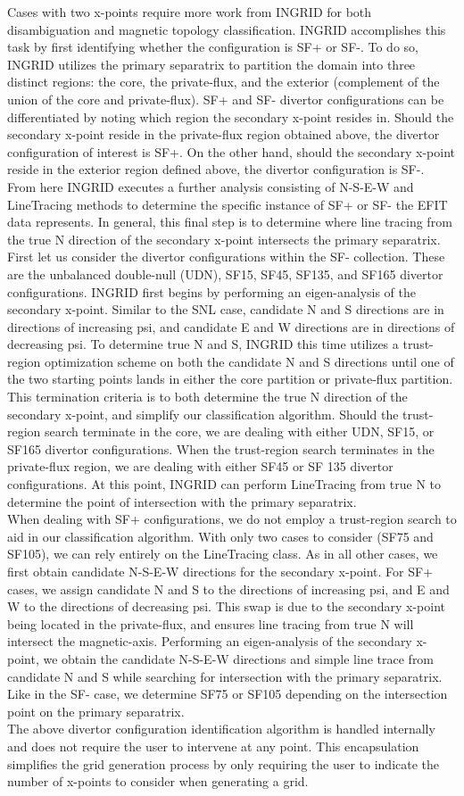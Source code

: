 Cases with two x-points require more work from INGRID for both disambiguation and magnetic topology classification. INGRID accomplishes this task by first identifying whether the configuration is SF+ or SF-. To do so, INGRID utilizes the primary separatrix to partition the domain into three distinct regions: the core, the private-flux, and the exterior (complement of the union of the core and private-flux). SF+ and SF- divertor configurations can be differentiated by noting which region the secondary x-point resides in. Should the secondary x-point reside in the private-flux region obtained above, the divertor configuration of interest is SF+. On the other hand, should the secondary x-point reside in the exterior region defined above, the divertor configuration is SF-. From here INGRID executes a further analysis consisting of N-S-E-W and LineTracing methods to determine the specific instance of SF+ or SF- the EFIT data represents. In general, this final step is to determine where line tracing from the true N direction of the secondary x-point intersects the primary separatrix.\\ \indent
First let us consider the divertor configurations within the SF- collection. These are the unbalanced double-null (UDN), SF15, SF45, SF135, and SF165 divertor configurations. INGRID first begins by performing an eigen-analysis of the secondary x-point. Similar to the SNL case, candidate N and S directions are in directions of increasing psi, and candidate E and W directions are in directions of decreasing psi. To determine true N and S, INGRID this time utilizes a trust-region optimization scheme on both the candidate N and S directions until one of the two starting points lands in either the core partition or private-flux partition. This termination criteria is to both determine the true N direction of the secondary x-point, and simplify our classification algorithm. Should the trust-region search terminate in the core, we are dealing with either UDN, SF15, or SF165 divertor configurations. When the trust-region search terminates in the private-flux region, we are dealing with either SF45 or SF 135 divertor configurations. At this point, INGRID can perform LineTracing from true N to determine the point of intersection with the primary separatrix.\\ \indent
When dealing with SF+ configurations, we do not employ a trust-region search to aid in our classification algorithm. With only two cases to consider (SF75 and SF105), we can rely entirely on the LineTracing class. As in all other cases, we first obtain candidate N-S-E-W directions for the secondary x-point. For SF+ cases, we assign candidate N and S to the directions of increasing psi, and E and W to the directions of decreasing psi. This swap is due to the secondary x-point being located in the private-flux, and ensures line tracing from true N will intersect the magnetic-axis. Performing an eigen-analysis of the secondary x-point, we obtain the candidate N-S-E-W directions and simple line trace from candidate N and S while searching for intersection with the primary separatrix. Like in the SF- case, we determine SF75 or SF105 depending on the intersection point on the primary separatrix.\\ \indent
The above divertor configuration identification algorithm is handled internally and does not require the user to intervene at any point. This encapsulation simplifies the grid generation process by only requiring the user to indicate the number of x-points to consider when generating a grid.